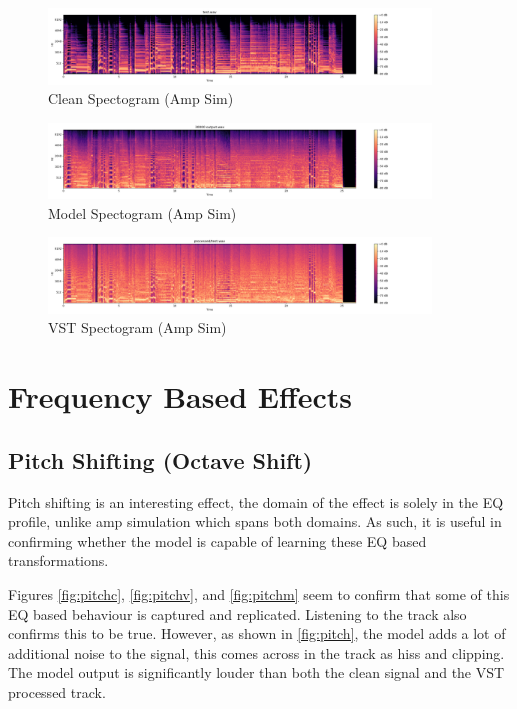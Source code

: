 \documentclass{l4proj}
\begin{document}
\begin{figure}
\centering
\includegraphics[width=4.00000in]{images/ampsimclean.png}
\caption{Clean Spectogram (Amp Sim)\label{fig:ampc}}
\end{figure}

\begin{figure}
\centering
\includegraphics[width=4.00000in]{images/ampsimmodel.png}
\caption{Model Spectogram (Amp Sim)\label{fig:ampm}}
\end{figure}

\begin{figure}
\centering
\includegraphics[width=4.00000in]{images/ampsimvst.png}
\caption{VST Spectogram (Amp Sim)\label{fig:ampv}}
\end{figure}

\section{Frequency Based Effects}\label{frequency-based-effects}

\subsection{Pitch Shifting (Octave
Shift)}\label{pitch-shifting-octave-shift}

Pitch shifting is an interesting effect, the domain of the effect is
solely in the EQ profile, unlike amp simulation which spans both
domains. As such, it is useful in confirming whether the model is
capable of learning these EQ based transformations.

Figures \ref{fig:pitchc}, \ref{fig:pitchv}, and \ref{fig:pitchm} seem to
confirm that some of this EQ based behaviour is captured and replicated.
Listening to the track also confirms this to be true. However, as shown
in \ref{fig:pitch}, the model adds a lot of additional noise to the
signal, this comes across in the track as hiss and clipping. The model
output is significantly louder than both the clean signal and the VST
processed track.
\end{document}
